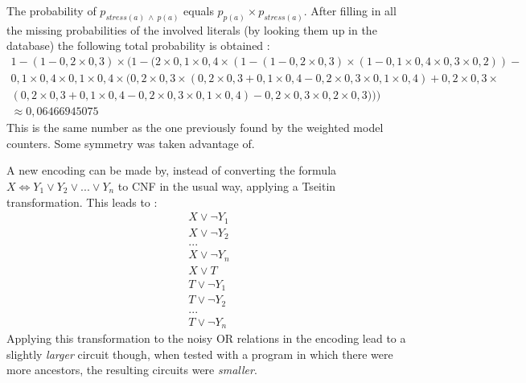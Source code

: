 The probability of $p_{stress(a)\ \land\ p(a)}$ equals $p_{p(a)}\times p_{stress(a)}$.
After filling in all the missing probabilities of the involved literals (by looking them up in the database) the following total probability is obtained :
\begin{gather*}
1-(1-0,2\times 0,3)\times (1-(2\times 0,1\times 0,4\times (1-(1-0,2\times 0,3)\times (1-0,1\times 0,4\times 0,3\times 0,2))-\\
0,1\times 0,4\times 0,1\times 0,4\times (0,2\times 0,3\times (0,2\times 0,3+0,1\times 0,4-0,2\times 0,3\times 0,1\times 0,4)+0,2\times 0,3\times\\ 
(0,2\times 0,3+0,1\times 0,4-0,2\times 0,3\times 0,1\times 0,4)-0,2\times 0,3\times 0,2\times 0,3)))\\
\approx 0,06466945075
\end{gather*}This is the same number as the one previously found by the weighted model counters. Some symmetry was taken advantage of.


A new encoding can be made by, instead of converting the formula $X\Leftrightarrow Y_1\lor Y_2 \lor ... \lor Y_n$ to CNF in the usual way, applying a Tseitin transformation. This leads to :
\begin{gather*}
X \lor \lnot Y_1\\
X \lor \lnot Y_2\\
...\\
X \lor \lnot Y_n\\
X \lor T\\
T \lor \lnot Y_1\\
T \lor \lnot Y_2\\
...\\
T \lor \lnot Y_n
\end{gather*}
Applying this transformation to the noisy OR relations in the encoding lead to a slightly \textit{larger} circuit though, when tested with a program in which there were more ancestors, the resulting circuits were \textit{smaller}.